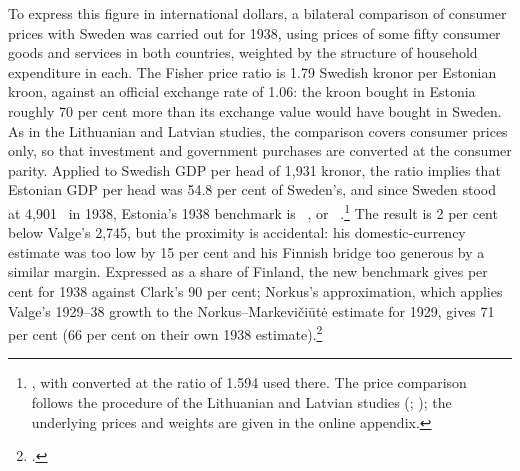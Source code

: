 To express this figure in international dollars, a bilateral comparison of consumer prices with Sweden was carried out for 1938, using prices of some fifty consumer goods and services in both countries, weighted by the structure of household expenditure in each. The Fisher price ratio is 1.79 Swedish kronor per Estonian kroon, against an official exchange rate of 1.06: the kroon bought in Estonia roughly 70 per cent more than its exchange value would have bought in Sweden. As in the Lithuanian and Latvian studies, the comparison covers consumer prices only, so that investment and government purchases are converted at the consumer parity. Applied to Swedish GDP per head of 1,931 kronor, the ratio implies that Estonian GDP per head was 54.8 per cent of Sweden's, and since Sweden stood at 4,901~\intlnineteen{} in 1938, Estonia's 1938 benchmark is ~\intlnineteen{}, or ~\intltwenty{}.\footnote{\autocite{mpd2023}, with \intltwenty{} converted at the ratio of 1.594 used there. The price comparison follows the procedure of the Lithuanian and Latvian studies (\autocite{klimantas2019}; \autocite{norkuslatvia1935}); the underlying prices and weights are given in the online appendix.} The result is 2 per cent below Valge's 2,745, but the proximity is accidental: his domestic-currency estimate was too low by 15 per cent and his Finnish bridge too generous by a similar margin. Expressed as a share of Finland, the new benchmark gives  per cent for 1938 against Clark's 90 per cent; Norkus's approximation, which applies Valge's 1929--38 growth to the Norkus--Markevi\v{c}i\={u}t\.{e} estimate for 1929, gives 71 per cent (66 per cent on their own 1938 estimate).\footnote{\autocite[128--30, 154]{norkus_restorations}.}

